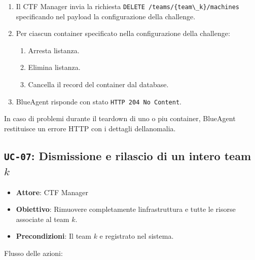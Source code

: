 \begin{enumerate}
\def\labelenumi{\arabic{enumi}.}
\tightlist
\item
  Il CTF Manager invia la richiesta
  \passthrough{\lstinline!DELETE /teams/\{team\_k\}/machines!}
  specificando nel payload la configurazione della challenge.
\item
  Per ciascun container specificato nella configurazione della
  challenge:

  \begin{enumerate}
  \def\labelenumii{\arabic{enumii}.}
  \tightlist
  \item
    Arresta l\textquotesingle istanza.
  \item
    Elimina l\textquotesingle istanza.
  \item
    Cancella il record del container dal database.
  \end{enumerate}
\item
  BlueAgent risponde con stato
  \passthrough{\lstinline!HTTP 204 No Content!}.
\end{enumerate}

In caso di problemi durante il teardown di uno o piu container,
BlueAgent restituisce un errore HTTP con i dettagli
dell\textquotesingle anomalia.

\subsection{\texorpdfstring{\texttt{UC-07}: Dismissione e rilascio di un
intero team
\(k\)}{UC-07: Dismissione e rilascio di un intero team k}}\label{uc-07-dismissione-e-rilascio-di-un-intero-team-k}

\begin{itemize}
\tightlist
\item
  \textbf{Attore}: CTF Manager
\item
  \textbf{Obiettivo}: Rimuovere completamente
  l\textquotesingle infrastruttura e tutte le risorse associate al team
  \(k\).
\item
  \textbf{Precondizioni}: Il team \(k\) e\textquotesingle{} registrato
  nel sistema.
\end{itemize}

Flusso delle azioni:

